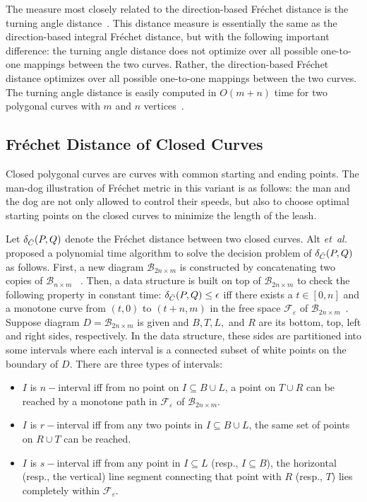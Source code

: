 \documentclass[12pt]{dalthesis}
\newcommand{\eps}{\varepsilon}
\newcommand{\etal}{{\em et~al.\/}}
\newcommand{\CF}{{\mathscr F}}
\newcommand{\CB}{{\mathscr B}}
\newcommand{\Frechet}{Fr\'echet }
\newcommand{\BNM}{\CB_{n \times m}}
\newcommand{\BNNM}{\CB_{2n \times m}}
\newcommand{\Feps}{\CF_\eps}
\begin{document}
The measure most
closely related to the direction-based \Frechet 
distance is the turning angle distance~\cite{Arkin1990}. This distance measure
is essentially the same as the direction-based integral \Frechet distance, but
with the following important difference: the turning angle distance 
does not optimize over all possible one-to-one mappings between the two curves. 
Rather, the direction-based \Frechet distance optimizes over all possible one-to-one mappings between the two curves. 
The turning angle distance is 
easily  computed in $O(m + n)$ time for two
polygonal curves with $m$ and $n$ vertices~\cite{Arkin1990}. 








\subsection{\Frechet Distance of Closed Curves}
\label{sec:RelatedClosed}
Closed polygonal curves are curves with common starting and ending points. 
The man-dog illustration of \Frechet metric in this variant is as follows:  
the man and the dog 
are not only allowed to control their speeds, 
but also to choose optimal starting points on the closed curves to minimize 
the length of the leash.

Let $\delta_{\bar{C}}(P,Q)$ denote the \Frechet distance between two closed curves. 
Alt \etal~\cite{AltG95} proposed a polynomial time algorithm 
to solve the decision problem of $\delta_{\bar{C}}(P,Q)$ as follows.
First, a new diagram $\BNNM$ is constructed by 
concatenating two copies of $\BNM$ ~\cite{AltG95}. 
Then, a data structure is built on top of $\BNNM$ to check 
the following property in constant time:
 $\delta_{\bar{C}}(P,Q) \le \epsilon$ iff there exists
a $t \in [0,n]$  and a monotone curve from
$(t,0)$ to $(t+n,m)$ in the free space $\Feps$ of $\BNNM$~\cite{AltG95}.
Suppose diagram $D = \BNNM$ is given and 
$B,T, L,$ and $R$ are its bottom, top, left and right sides, respectively.
In the data structure, these sides are partitioned into some intervals 
where each interval is a connected subset of white points on the 
boundary of $D$. There are three types of intervals: 



\begin{itemize}\itemsep1pt

	\item $I$ is $n-$interval iff from no point on $I \subseteq B \cup L$, 
	a point on  $T \cup R$ can be reached by a monotone path 
	in $\Feps$ of $\BNNM$.
	
	\item $I$ is $r-$interval iff from any two points in $I \subseteq B \cup L$, the same set of points on $R \cup T$  can be reached.
	
	
	\item $I$ is $s-$interval iff from any point in $I \subseteq  L$ (resp., $I \subseteq  B$), 
	the horizontal (resp., the vertical) line segment connecting that point with $R$ (resp., $T$) lies 
	completely within $\Feps$.

\end{itemize} 
\end{document}
